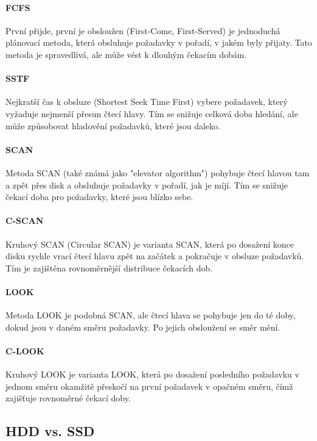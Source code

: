 \paragraph{FCFS}
První přijde, první je obsloužen (First-Come, First-Served) je jednoduchá plánovací metoda, která obsluhuje požadavky v pořadí, v jakém byly přijaty. Tato metoda je spravedlivá, ale může vést k dlouhým čekacím dobám.

\paragraph{SSTF}
Nejkratší čas k obsluze (Shortest Seek Time First) vybere požadavek, který vyžaduje nejmenší přesun čtecí hlavy. Tím se snižuje celková doba hledání, ale může způsobovat hladovění požadavků, které jsou daleko.

\paragraph{SCAN}
Metoda SCAN (také známá jako "elevator algorithm") pohybuje čtecí hlavou tam a zpět přes disk a obsluhuje požadavky v pořadí, jak je míjí. Tím se snižuje čekací doba pro požadavky, které jsou blízko sebe.

\paragraph{C-SCAN}
Kruhový SCAN (Circular SCAN) je varianta SCAN, která po dosažení konce disku rychle vrací čtecí hlavu zpět na začátek a pokračuje v obsluze požadavků. Tím je zajištěna rovnoměrnější distribuce čekacích dob.

\paragraph{LOOK}
Metoda LOOK je podobná SCAN, ale čtecí hlava se pohybuje jen do té doby, dokud jsou v daném směru požadavky. Po jejich obsloužení se směr mění.

\paragraph{C-LOOK}
Kruhový LOOK je varianta LOOK, která po dosažení posledního požadavku v jednom směru okamžitě přeskočí na první požadavek v opačném směru, čímž zajišťuje rovnoměrné čekací doby.

\subsection{HDD vs. SSD}
